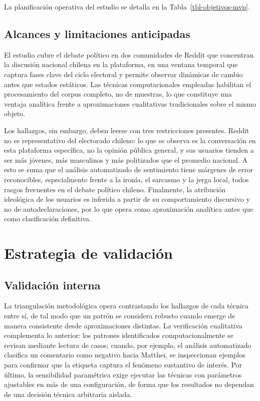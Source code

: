 \documentclass[
  letterpaper,
  numbers=noendperiod,
  fontsize=11pt,
  DIV=12,
  titlepage=false]{scrreprt}
\begin{document}
La planificación operativa del estudio se detalla en la
Tabla~\ref{tbl-objetivos-mvp}.

\subsection{Alcances y limitaciones
anticipadas}\label{alcances-y-limitaciones-anticipadas}

El estudio cubre el debate político en dos comunidades de Reddit que
concentran la discusión nacional chilena en la plataforma, en una
ventana temporal que captura fases clave del ciclo electoral y permite
observar dinámicas de cambio antes que estados estáticos. Las técnicas
computacionales empleadas habilitan el procesamiento del corpus
completo, no de muestras, lo que constituye una ventaja analítica frente
a aproximaciones cualitativas tradicionales sobre el mismo objeto.

Los hallazgos, sin embargo, deben leerse con tres restricciones
presentes. Reddit no es representativo del electorado chileno: lo que se
observa es la conversación en esta plataforma específica, no la opinión
pública general, y sus usuarios tienden a ser más jóvenes, más
masculinos y más politizados que el promedio nacional. A esto se suma
que el análisis automatizado de sentimiento tiene márgenes de error
reconocibles, especialmente frente a la ironía, el sarcasmo y la jerga
local, todos rasgos frecuentes en el debate político chileno.
Finalmente, la atribución ideológica de los usuarios es inferida a
partir de su comportamiento discursivo y no de autodeclaraciones, por lo
que opera como aproximación analítica antes que como clasificación
definitiva.

\section{Estrategia de validación}\label{estrategia-de-validaciuxf3n}

\subsection{Validación interna}\label{validaciuxf3n-interna}

La triangulación metodológica opera contrastando los hallazgos de cada
técnica entre sí, de tal modo que un patrón se considera robusto cuando
emerge de manera consistente desde aproximaciones distintas. La
verificación cualitativa complementa lo anterior: los patrones
identificados computacionalmente se revisan mediante lectura de casos;
cuando, por ejemplo, el análisis automatizado clasifica un comentario
como negativo hacia Matthei, se inspeccionan ejemplos para confirmar que
la etiqueta captura el fenómeno sustantivo de interés. Por último, la
sensibilidad paramétrica exige ejecutar las técnicas con parámetros
ajustables en más de una configuración, de forma que los resultados no
dependan de una decisión técnica arbitraria aislada.
\end{document}
